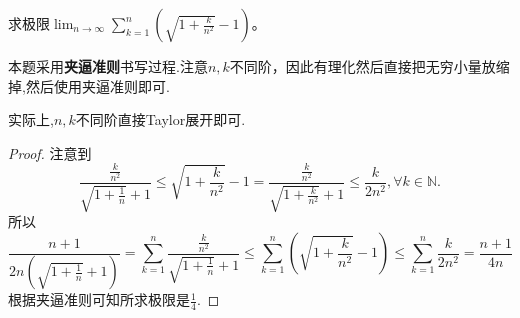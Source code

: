 \documentclass[../../main.tex]{subfiles}%
\begin{document}
\begin{example}\label{example-夹逼准则书写过程示例}
求极限\(\lim_{n\rightarrow\infty}\sum\limits_{k = 1}^{n}\left(\sqrt{1 + \frac{k}{n^{2}}} - 1\right)\)。
\end{example}
\begin{note}
本题采用\textbf{夹逼准则}书写过程.注意\(n,k\)不同阶，因此有理化然后直接把无穷小量放缩掉,然后使用夹逼准则即可.

实际上,$n,k$不同阶直接Taylor展开即可.
\end{note}
\begin{proof}

注意到
\[
\frac{\frac{k}{n^{2}}}{\sqrt{1 + \frac{1}{n}} + 1}\leqslant \sqrt{1 + \frac{k}{n^{2}}} - 1 = \frac{\frac{k}{n^{2}}}{\sqrt{1 + \frac{k}{n^{2}}} + 1}\leqslant \frac{k}{2n^{2}},\forall k\in \mathbb{N}.
\]
所以
\[
\frac{n + 1}{2n\left(\sqrt{1 + \frac{1}{n}} + 1\right)}=\sum\limits_{k = 1}^{n}\frac{\frac{k}{n^{2}}}{\sqrt{1 + \frac{1}{n}} + 1}\leqslant \sum\limits_{k = 1}^{n}\left(\sqrt{1 + \frac{k}{n^{2}}} - 1\right)\leqslant \sum\limits_{k = 1}^{n}\frac{k}{2n^{2}}=\frac{n + 1}{4n}
\]
根据夹逼准则可知所求极限是\(\frac{1}{4}\).

\end{proof}
\end{document}
